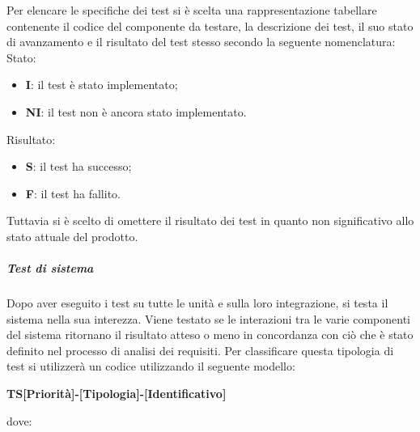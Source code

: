                 Per elencare le specifiche dei test si è scelta una rappresentazione tabellare contenente il codice del componente da testare, la descrizione dei test, il suo stato di avanzamento e il risultato del test stesso secondo la seguente nomenclatura: \\
                Stato:
                \begin{itemize}
                    \item \textbf{I}: il test è stato implementato;
                    \item \textbf{NI}: il test non è ancora stato implementato.     
                \end{itemize}
                Risultato:
                \begin{itemize}
                    \item \textbf{S}: il test ha successo;
                    \item \textbf{F}: il test ha fallito.
                \end{itemize}
                Tuttavia si è scelto di omettere il risultato dei test in quanto non significativo allo stato attuale del prodotto.


            \subparagraph*{Test di sistema}
                Dopo aver eseguito i test su tutte le unità e sulla loro integrazione, si testa il sistema nella sua interezza. Viene testato se le interazioni tra le varie componenti del sistema ritornano il risultato atteso o meno in concordanza con ciò che è stato definito nel processo di analisi dei requisiti.
                Per classificare questa tipologia di test si utilizzerà un codice utilizzando il seguente modello:     

                \begin{center}
                \textbf{TS[Priorità]-[Tipologia]-[Identificativo]}
                \end{center}
                dove: 
                
